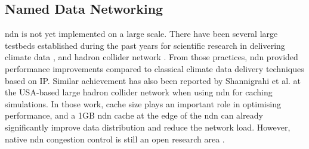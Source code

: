\documentclass[conference]{IEEEtran}
\begin{document}
\subsection{Named Data Networking}
\gls{ndn} is not yet implemented on a large scale. There have been several large testbeds established during the past years for scientific research in delivering climate data \cite{lim2018ndn}, and hadron collider network \cite{shannigrahi2015named}. From those practices, \gls{ndn} provided performance improvements compared to classical climate data delivery techniques based on IP. Similar achievement has also been reported by Shannigrahi et al. at the USA-based large hadron collider network \cite{shannigrahi2015named} when using \gls{ndn} for caching simulations. In those work, cache size plays an important role in optimising performance, and a 1GB \gls{ndn} cache at the edge of the \gls{ndn} can already significantly improve data distribution and reduce the network load. However, native \gls{ndn} congestion control is still an open research area \cite{ren2016congestion}.

\end{document}
